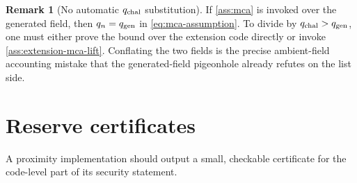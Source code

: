 \documentclass[11pt]{article}
\theoremstyle{definition}
\newtheorem{remark}[theorem]{Remark}
\newcommand{\qgen}{q_{\rm gen}}
\newcommand{\qchal}{q_{\rm chal}}
\begin{document}
\begin{remark}[No automatic $\qchal$ substitution]
\label{rem:no-substitution}
If \cref{ass:mca} is invoked over the generated field, then $q_n=\qgen$ in \eqref{eq:mca-assumption}.  To divide by $\qchal>\qgen$, one must either prove the bound over the extension code directly or invoke \cref{ass:extension-mca-lift}.  Conflating the two fields is the precise ambient-field accounting mistake that the generated-field pigeonhole already refutes on the list side.
\end{remark}

\section{Reserve certificates}
\label{sec:certificate}

A proximity implementation should output a small, checkable certificate for the code-level part of its security statement.
\end{document}
